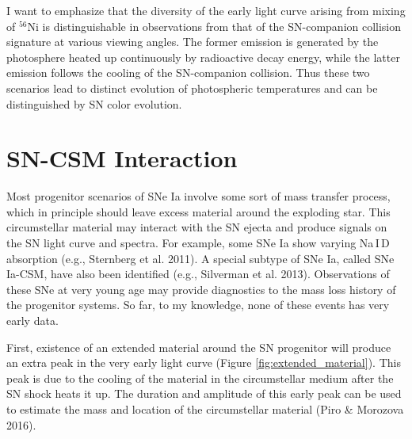 \documentclass[11pt]{article}
\begin{document}
I want to emphasize that the diversity of the early light curve
arising from mixing of $^{56}$Ni is distinguishable in observations
from that of the SN-companion collision signature at various viewing
angles. The former emission is generated by the photosphere heated up
continuously by radioactive decay energy, while the latter emission
follows the cooling of the SN-companion collision. Thus these two
scenarios lead to distinct evolution of photospheric temperatures and
can be distinguished by SN color evolution.

\section{SN-CSM Interaction}
\label{sec:sn_csm_interaction}

Most progenitor scenarios of SNe Ia involve some sort of mass transfer
process, which in principle should leave excess material around the
exploding star. This circumstellar material may interact with the SN
ejecta and produce signals on the SN light curve and spectra. For
example, some SNe Ia show varying Na\,I\,D absorption (e.g., Sternberg
et al. 2011). A special subtype of SNe Ia, called SNe Ia-CSM, have
also been identified (e.g., Silverman et al. 2013). Observations of
these SNe at very young age may provide diagnostics to the mass loss
history of the progenitor systems. So far, to my knowledge, none of
these events has very early data.

First, existence of an extended material around the SN progenitor will
produce an extra peak in the very early light curve (Figure
\ref{fig:extended_material}). This peak is due to the cooling of the
material in the circumstellar medium after the SN shock heats it up.
The duration and amplitude of this early peak can be used to estimate
the mass and location of the circumstellar material (Piro \& Morozova
2016).
\end{document}
